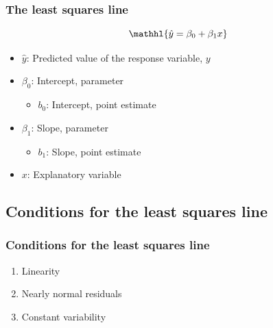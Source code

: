 \begin{frame}
\frametitle{The least squares line}

\[ \mathhl{ \hat{y} = \beta_0 + \beta_1 x } \]

\begin{itemize}
\item $\hat{y}$: Predicted value of the response variable, $y$
\item $\beta_0$: Intercept, parameter
\begin{itemize}
\item $b_0$: Intercept, point estimate
\end{itemize}
\item $\beta_1$: Slope, parameter
\begin{itemize}
\item $b_1$: Slope, point estimate
\end{itemize}
\item $x$: Explanatory variable
\end{itemize}

\end{frame}


\subsection{Conditions for the least squares line}


\begin{frame}
\frametitle{Conditions for the least squares line}

\begin{enumerate}

\item Linearity

\pause

\item Nearly normal residuals

\pause

\item Constant variability

\end{enumerate}

\end{frame}


